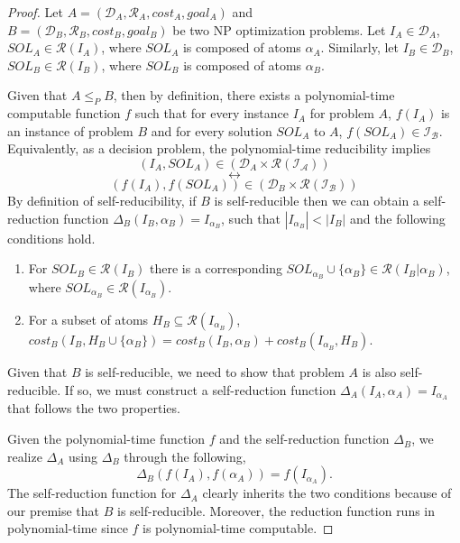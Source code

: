 \documentclass[journal]{acm_proc_article-sp}
\begin{document}
\begin{proof}
Let $A = (\mathcal{D}_A, \mathcal{R}_A, cost_A, goal_A)$ and \\
$B = (\mathcal{D}_B, \mathcal{R}_B, cost_B, goal_B)$ be two NP optimization problems. Let $I_A \in \mathcal{D}_A$, $SOL_A \in \mathcal{R}(I_A)$, where $SOL_A$ is composed of atoms $\alpha_A$. Similarly, let $I_B \in \mathcal{D}_B$, $SOL_B \in \mathcal{R}(I_B)$, where $SOL_B$ is composed of atoms $\alpha_B$.

Given that $A \leq_P B$, then by definition, there exists a polynomial-time computable function $f$ such that  for every instance $I_A$ for problem $A$, $f(I_A)$ is an instance of problem $B$ and for every solution $SOL_A$ to $A$, $f(SOL_A) \in \mathcal{I_B}$. Equivalently, as a decision problem, the polynomial-time reducibility implies
$$(I_A, SOL_A) \in (\mathcal{D}_A \times \mathcal{R(I_A)}) $$ $$\leftrightarrow $$ $$(f(I_A), f(SOL_A)) \in (\mathcal{D}_B \times \mathcal{R(I_B)})  $$
By definition of self-reducibility, if $B$ is self-reducible then we can obtain a self-reduction function $\Delta_B(I_B, \alpha_B) = I_{\alpha_B}$, such that $|I_{\alpha_B}| < |I_B|$ and the following conditions hold.
\begin{enumerate}

\item For $SOL_B \in \mathcal{R}(I_B)$ there is a corresponding  $SOL_{\alpha_B} \cup \{\alpha_B\} \in \mathcal{R}(I_B| \alpha_B) $, where $SOL_{\alpha_B} \in \mathcal{R}(I_{\alpha_B})$.

\item For a subset of atoms $H_B \subseteq \mathcal{R}(I_{\alpha_B})$,   $cost_B(I_B, H_B \cup  \{\alpha_B\}) = cost_B(I_B, \alpha_B) + cost_B(I_{\alpha_B}, H_B)$.  
\end{enumerate}

Given that $B$ is self-reducible, we need to show that problem $A$ is also self-reducible.
If so, we must construct a self-reduction function $\Delta_A(I_A, \alpha_A) = I_{\alpha_A}$ that follows the two properties.
 
Given the polynomial-time function $f$ and the self-reduction function $\Delta_B$, we realize $\Delta_A$ using $\Delta_B$ through the following,
 $$\Delta_B(f(I_A), f(\alpha_A)) = f(I_{\alpha_A}).$$ 
The self-reduction function for $\Delta_A$ clearly inherits the two conditions because of our premise that $B$ is self-reducible. Moreover, the reduction function runs in polynomial-time since $f$ is polynomial-time computable.
 \end{proof}
 
\end{document}
